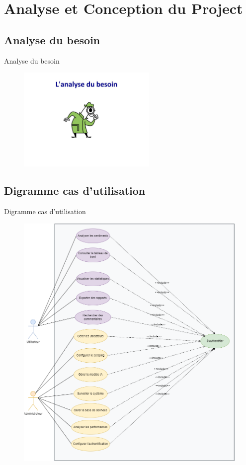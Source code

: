 \section{Analyse et Conception du Project}
\subsection{Analyse du besoin}
\begin{frame}{Analyse du besoin}
    \begin{figure}[H]
        \centering
        \includegraphics[height=5cm]{assets/images/analyse-besoin.jpg}
    \end{figure}

\end{frame}

\subsection{Digramme cas d'utilisation}
\begin{frame}{Digramme cas d'utilisation}
    \begin{figure}[H]
        \centering
        \includegraphics[scale=0.2]{assets/images/usecase.png}
    \end{figure}
\end{frame}


